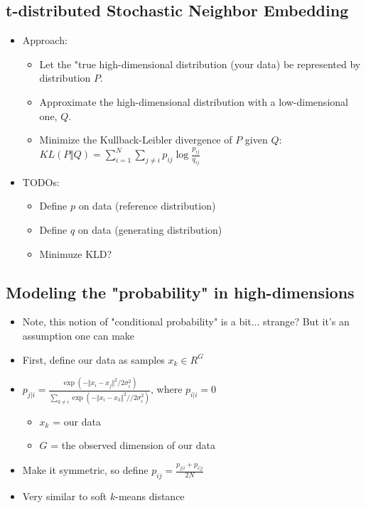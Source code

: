 \documentclass[10pt]{article}
\begin{document}
\subsection*{t-distributed Stochastic Neighbor Embedding}
\begin{itemize}
    \item Approach:
    \begin{itemize}
        \item Let the "true high-dimensional distribution (your data) be represented by distribution $P$.
        \item Approximate the high-dimensional distribution with a low-dimensional one, $Q$.
        \item Minimize the Kullback-Leibler divergence of $P$ given $Q$: $KL(P \Vert Q) = \sum_{i=1}^N \sum_{j \neq i} p_{ij} \log \frac{p_{ij}}{q_{ij}}$
    \end{itemize}
    \item TODOs:
    \begin{itemize}
        \item Define $p$ on data (reference distribution)
        \item Define $q$ on data (generating distribution)
        \item Minimuze KLD?
    \end{itemize}
\end{itemize}

\subsection*{Modeling the "probability" in high-dimensions}
\begin{itemize}
    \item Note, this notion of "conditional probability" is a bit... strange?  But it's an assumption one can make
    \item First, define our data as samples $x_k \in R^G$
    \item $p_{j \vert i} = \frac{\exp (- \Vert x_i - x_j \Vert^2 / 2 \sigma_i^2)}{\sum_{k \neq i} \exp (- \Vert x_i - x_k \Vert^2 // 2\sigma_i^2)}$, where $p_{i \vert i} = 0$
    \begin{itemize}
        \item $x_k$ = our data
        \item $G$ = the observed dimension of our data
    \end{itemize}
    \item Make it symmetric, so define $p_{ij} = \frac{p_{j \vert i} + p_{i \vert j}}{2N}$
    \item Very similar to soft $k$-means distance
\end{itemize}
\end{document}
